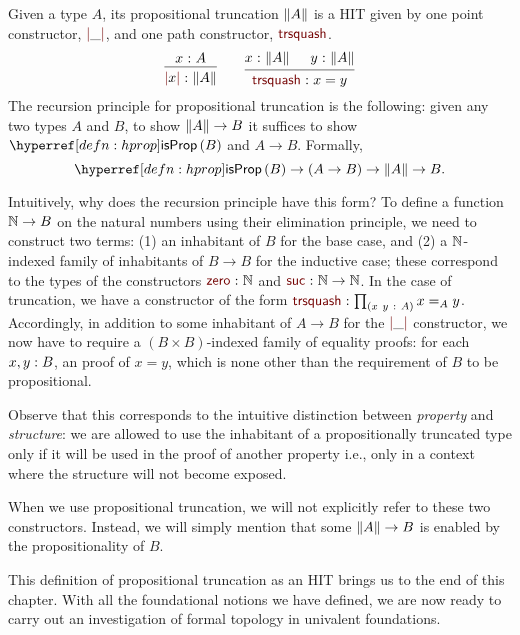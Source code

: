 \begin{defn}\label{defn:truncation}
  Given a type $A$, its propositional truncation $\left\| A \right\|$ is a HIT given by one point
  constructor, $\rulename{|}\_\rulename{|}$, and one path constructor,
  $\rulename{trsquash}$.
  \begin{equation*}
    \begin{prooftree}
      \hypo{\oftyI{x}{A}}
      \infer1{\oftyI{\rulename{|}x\rulename{|}}{\trunc{A}}}
    \end{prooftree}
    \qquad
    \begin{prooftree}
      \hypo{\oftyI{x}{\trunc{A}}}
      \hypo{\oftyI{y}{\trunc{A}}}
      \infer2{\oftyI{\rulename{trsquash}}{x = y}}
    \end{prooftree}
  \end{equation*}
  The recursion principle for propositional truncation is the following: given any two
  types $A$ and $B$, to show $\left\| A \right\| \rightarrow B$ it suffices to show $\isprop{B}$ and $A \rightarrow B$.
  Formally,
  \begin{equation*}
    \isprop{B} \rightarrow (A \rightarrow B) \rightarrow \trunc{A} \rightarrow B.
  \end{equation*}
\end{defn}

Intuitively, why does the recursion principle have this form? To define a function
$\mathbb{N}{} \rightarrow B$ on the natural numbers using their elimination principle, we need to
construct two terms: (1) an inhabitant of $B$ for the base case, and (2) a
$\mathbb{N}{}$-indexed family of inhabitants of $B \rightarrow B$ for the inductive case; these
correspond to the types of the constructors $\oftyI{\zero{}}{\nats{}}$ and
$\oftyI{\sucnm{}}{\nats{} \rightarrow \nats{}}$. In the case of truncation, we have a constructor of
the form $\oftyI{\rulename{trsquash}}{\pity{x~y}{A}{x =_A y}}$. Accordingly, in addition
to some inhabitant of $A \rightarrow B$ for the $\rulename{|}\_\rulename{|}$ constructor, we now
have to require a $(B \times B)$-indexed family of equality proofs: for each
$x, y:B$, an proof of $x = y$, which is none other than the requirement of $B$
to be propositional.

Observe that this corresponds to the intuitive distinction between \emph{property} and
\emph{structure}: we are allowed to use the inhabitant of a propositionally truncated type
only if it will be used in the proof of another property i.e., only in a context where the
structure will not become exposed.

When we use propositional truncation, we will not explicitly refer to these two
constructors. Instead, we will simply mention that some $\left\| A \right\| \rightarrow B$ is enabled by the
propositionality of $B$.

This definition of propositional truncation as an HIT brings us to the end of this
chapter. With all the foundational notions we have defined, we are now ready to carry out
an investigation of formal topology in univalent foundations.

